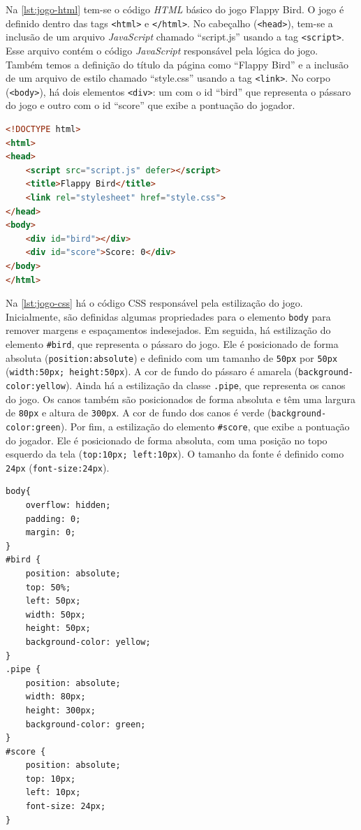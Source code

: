 Na \autoref{lst:jogo-html} tem-se o código \textit{HTML} básico do jogo Flappy Bird. O jogo é definido dentro das tags \texttt{<html>} e \texttt{</html>}. No cabeçalho (\texttt{<head>}), tem-se a inclusão de um arquivo \textit{JavaScript} chamado ``script.js'' usando a tag \texttt{<script>}. Esse arquivo contém o código \textit{JavaScript} responsável pela lógica do jogo. Também temos a definição do título da página como ``Flappy Bird'' e a inclusão de um arquivo de estilo chamado ``style.css'' usando a tag \texttt{<link>}. No corpo (\texttt{<body>}), há dois elementos \texttt{<div>}: um com o id ``bird'' que representa o pássaro do jogo e outro com o id ``score'' que exibe a pontuação do jogador.

\Needspace{0.3\textheight}
\begin{lstlisting}[language=html, caption={HTML do jogo}, label=lst:jogo-html]
<!DOCTYPE html>
<html>
<head>
    <script src="script.js" defer></script>
    <title>Flappy Bird</title>
    <link rel="stylesheet" href="style.css">
</head>
<body>
    <div id="bird"></div>
    <div id="score">Score: 0</div>
</body>
</html>
\end{lstlisting}

Na \autoref{lst:jogo-css} há o código CSS responsável pela estilização do jogo. Inicialmente, são definidas algumas propriedades para o elemento \texttt{body} para remover margens e espaçamentos indesejados. Em seguida, há estilização do elemento \texttt{\#bird}, que representa o pássaro do jogo. Ele é posicionado de forma absoluta (\texttt{position:absolute}) e definido com um tamanho de \texttt{50px} por \texttt{50px} (\texttt{width:50px; height:50px}). A cor de fundo do pássaro é amarela (\texttt{background-color:yellow}). Ainda há a estilização da classe \texttt{.pipe}, que representa os canos do jogo. Os canos também são posicionados de forma absoluta e têm uma largura de \texttt{80px} e altura de \texttt{300px}. A cor de fundo dos canos é verde (\texttt{background-color:green}). Por fim, a estilização do elemento \texttt{\#score}, que exibe a pontuação do jogador. Ele é posicionado de forma absoluta, com uma posição no topo esquerdo da tela (\texttt{top:10px; left:10px}). O tamanho da fonte é definido como \texttt{24px} (\texttt{font-size:24px}).


\begin{lstlisting}[language=html, caption={CSS do jogo}, label=lst:jogo-css]
body{
    overflow: hidden;
    padding: 0;
    margin: 0;
}
#bird {
    position: absolute;
    top: 50%;
    left: 50px;
    width: 50px;
    height: 50px;
    background-color: yellow;
}
.pipe {
    position: absolute;
    width: 80px;
    height: 300px;
    background-color: green;
}
#score {
    position: absolute;
    top: 10px;
    left: 10px;
    font-size: 24px;
}
\end{lstlisting}


